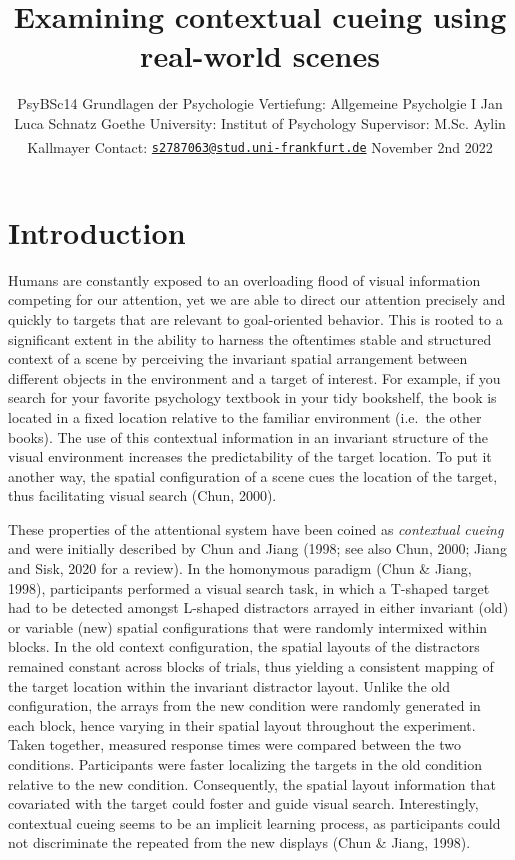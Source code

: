 \documentclass[
  man,floatsintext]{apa7}
\title{Examining contextual cueing using real-world scenes}
\author{PsyBSc14 Grundlagen der Psychologie Vertiefung: Allgemeine Psycholgie I \break Jan Luca Schnatz \break Goethe University: Institut of Psychology \break Supervisor: M.Sc. Aylin Kallmayer \break Contact: \href{mailto:s2787063@stud.uni-frankfurt.de}{\nolinkurl{s2787063@stud.uni-frankfurt.de}} \break November 2nd 2022\textsuperscript{}}
\date{}
\affiliation{\phantom{0}}
\begin{document}
\maketitle

\newpage

\hypertarget{introduction}{%
\section{Introduction}\label{introduction}}

Humans are constantly exposed to an overloading flood of visual information competing for our attention, yet we are able to direct our attention precisely and quickly to targets that are relevant to goal-oriented behavior. This is rooted to a significant extent in the ability to harness the oftentimes stable and structured context of a scene by perceiving the invariant spatial arrangement between different objects in the environment and a target of interest. For example, if you search for your favorite psychology textbook in your tidy bookshelf, the book is located in a fixed location relative to the familiar environment (i.e.~the other books). The use of this contextual information in an invariant structure of the visual environment increases the predictability of the target location. To put it another way, the spatial configuration of a scene cues the location of the target, thus facilitating visual search (Chun, 2000).

These properties of the attentional system have been coined as \emph{contextual cueing} and were initially described by Chun and Jiang (1998; see also Chun, 2000; Jiang and Sisk, 2020 for a review). In the homonymous paradigm (Chun \& Jiang, 1998), participants performed a visual search task, in which a T-shaped target had to be detected amongst L-shaped distractors arrayed in either invariant (old) or variable (new) spatial configurations that were randomly intermixed within blocks. In the old context configuration, the spatial layouts of the distractors remained constant across blocks of trials, thus yielding a consistent mapping of the target location within the invariant distractor layout. Unlike the old configuration, the arrays from the new condition were randomly generated in each block, hence varying in their spatial layout throughout the experiment. Taken together, measured response times were compared between the two conditions. Participants were faster localizing the targets in the old condition relative to the new condition. Consequently, the spatial layout information that covariated with the target could foster and guide visual search. Interestingly, contextual cueing seems to be an implicit learning process, as participants could not discriminate the repeated from the new displays (Chun \& Jiang, 1998).
\end{document}

